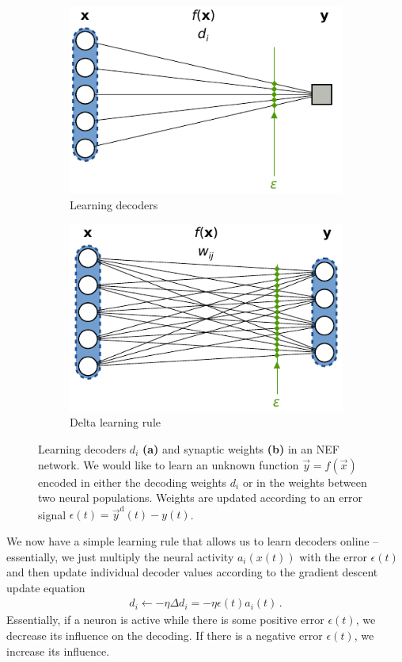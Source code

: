 \documentclass[10pt,letterpaper,oneside]{article}
\begin{document}
\begin{figure}
	\centering%
	\begin{subfigure}{0.5\textwidth}%
		\centering%
		\includegraphics{media/pes_network_a.pdf}%
		\caption{Learning decoders}%
	\end{subfigure}%
	\begin{subfigure}{0.5\textwidth}%
		\centering%
		\includegraphics{media/pes_network_b.pdf}%
		\caption{Delta learning rule}%
	\end{subfigure}%
	\caption{Learning decoders $d_i$ \textbf{(a)} and synaptic weights \textbf{(b)} in an NEF network. We would like to learn an unknown function $\vec y = f(\vec x)$ encoded in either the decoding weights $d_i$ or in the weights between two neural populations. Weights are updated according to an error signal $\epsilon(t) = \vec y^\mathrm{d}(t) - y(t)$.}
\end{figure}

We now have a simple learning rule that allows us to learn decoders online -- essentially, we just multiply the neural activity $a_i(x(t))$ with the error $\epsilon(t)$ and then update individual decoder values according to the gradient descent update equation
\begin{align*}
	d_i \gets -\eta \Delta d_i = -\eta \epsilon(t) a_i(t) \,.
\end{align*}
Essentially, if a neuron is active while there is some positive error $\epsilon(t)$, we decrease its influence on the decoding. If there is a negative error $\epsilon(t)$, we increase its influence.
\end{document}
